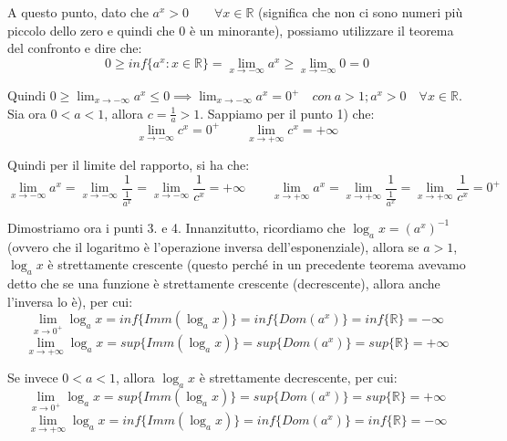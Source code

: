 \documentclass{article}
\begin{document}
\noindent A questo punto, dato che $a^x > 0 \qquad \forall x \in \mathbb{R}$ (significa che non ci sono numeri più piccolo dello zero e quindi che $0$ è un minorante), possiamo utilizzare il teorema del confronto e dire che:
\begin{equation*}
    0 \geq inf\{a^x : x \in \mathbb{R}\} = \lim_{x \to -\infty} a^x \geq \lim_{x \to -\infty} 0 = 0
\end{equation*}

\noindent Quindi $0 \geq \lim_{x \to -\infty} a^x \leq 0 \implies \lim_{x \to -\infty} a^x = 0^+ \quad con \ a > 1; a^x > 0 \quad \forall x \in \mathbb{R}$.\\
Sia ora $0 < a < 1$, allora $c = \frac{1}{a} > 1$. Sappiamo per il punto 1) che:
\begin{equation*}
    \lim_{x \to -\infty} c^x = 0^+ \qquad \lim_{x \to +\infty} c^x = +\infty
\end{equation*}

\noindent Quindi per il limite del rapporto, si ha che:
\begin{equation*}
    \lim_{x \to -\infty} a^x = \lim_{x \to -\infty} \frac{1}{\frac{1}{a^x}} = \lim_{x \to -\infty} \frac{1}{c^x} = +\infty \qquad \lim_{x \to +\infty} a^x = \lim_{x \to +\infty} \frac{1}{\frac{1}{a^x}} = \lim_{x \to +\infty} \frac{1}{c^x} = 0^+
\end{equation*}

\noindent Dimostriamo ora i punti 3. e 4. Innanzitutto, ricordiamo che $\log_ax = (a^x)^{-1}$ (ovvero che il logaritmo è l'operazione inversa dell'esponenziale), allora se $a > 1$, $\log_ax$ è strettamente crescente (questo perché in un precedente teorema avevamo detto che se una funzione è strettamente crescente (decrescente), allora anche l'inversa lo è), per cui:
\begin{equation*}
    \lim_{x \to 0^+} \log_ax = inf\{Imm(\log_ax)\} = inf\{Dom(a^x)\} = inf\{\mathbb{R}\} = - \infty
\end{equation*}
\begin{equation*}
    \lim_{x \to +\infty} \log_ax = sup\{Imm(\log_ax)\} = sup\{Dom(a^x)\} = sup\{\mathbb{R}\} = + \infty
\end{equation*}

\noindent Se invece $0 < a < 1$, allora $\log_ax$ è strettamente decrescente, per cui:
\begin{equation*}
    \lim_{x \to 0^+} \log_ax = sup\{Imm(\log_ax)\} = sup\{Dom(a^x)\} = sup\{\mathbb{R}\} = + \infty
\end{equation*}
\begin{equation*}
    \lim_{x \to +\infty} \log_ax = inf\{Imm(\log_ax)\} = inf\{Dom(a^x)\} = inf\{\mathbb{R}\} = - \infty
\end{equation*}
\end{document}
